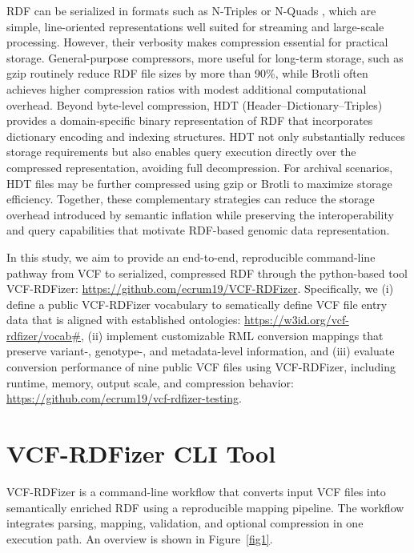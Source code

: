 \documentclass[unnumsec,webpdf,contemporary,large]{oup-authoring-template}
\begin{document}
RDF can be serialized in formats such as N-Triples or N-Quads \cite{nquads_2014}, which are simple, line-oriented representations well suited for streaming and large-scale processing. 
However, their verbosity makes compression essential for practical storage. 
General-purpose compressors, more useful for long-term storage, such as gzip routinely reduce RDF file sizes by more than 90\%, while Brotli \cite{brotli_2019} often achieves higher compression ratios with modest additional computational overhead.
Beyond byte-level compression, HDT (Header–Dictionary–Triples) \cite{hdt_2013} provides a domain-specific binary representation of RDF that incorporates dictionary encoding and indexing structures. 
HDT not only substantially reduces storage requirements but also enables query execution directly over the compressed representation, avoiding full decompression. 
For archival scenarios, HDT files may be further compressed using gzip or Brotli to maximize storage efficiency.
Together, these complementary strategies can reduce the storage overhead introduced by semantic inflation while preserving the interoperability and query capabilities that motivate RDF-based genomic data representation.

In this study, we aim to provide an end-to-end, reproducible command-line pathway from VCF to serialized, compressed RDF through the python-based tool VCF-RDFizer: \url{https://github.com/ecrum19/VCF-RDFizer}. 
Specifically, we (i) define a public VCF-RDFizer vocabulary to sematically define VCF file entry data that is aligned with established ontologies: \url{https://w3id.org/vcf-rdfizer/vocab\#}, (ii) implement customizable RML conversion mappings that preserve variant-, genotype-, and metadata-level information, and (iii) evaluate conversion performance of nine public VCF files using VCF-RDFizer, including runtime, memory, output scale, and compression behavior: \url{https://github.com/ecrum19/vcf-rdfizer-testing}.


\section{VCF-RDFizer CLI Tool}\label{sec2}
VCF-RDFizer is a command-line workflow that converts input VCF files into semantically enriched RDF using a reproducible mapping pipeline. 
The workflow integrates parsing, mapping, validation, and optional compression in one execution path. 
An overview is shown in Figure~\ref{fig1}.
\end{document}
